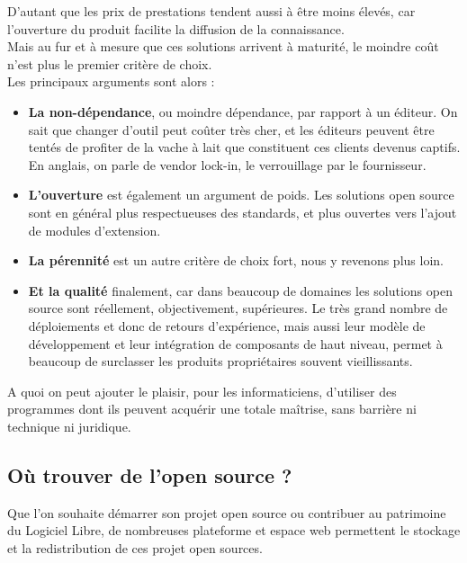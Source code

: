 			D'autant que les prix de prestations tendent aussi à être moins élevés, car l'ouverture du produit facilite la diffusion de la connaissance.\\

			Mais au fur et à mesure que ces solutions arrivent à maturité, le moindre coût n'est plus le premier critère de choix.\\
			Les principaux arguments sont alors :\\


			\begin{itemize}[label=\textbullet, font=\LARGE \color{burntorange}]
				\item \textbf{La non-dépendance}, ou moindre dépendance, par rapport à un éditeur. On sait que changer d'outil peut coûter très cher, et les éditeurs peuvent être tentés de profiter de la vache à lait que constituent ces clients devenus captifs. En anglais, on parle de vendor lock-in, le verrouillage par le fournisseur.
				\item \textbf{L'ouverture} est également un argument de poids. Les solutions open source sont en général plus respectueuses des standards, et plus ouvertes vers l'ajout de modules d'extension.
				\item \textbf{La pérennité} est un autre critère de choix fort, nous y revenons plus loin.
				\item \textbf{Et la qualité} finalement, car dans beaucoup de domaines les solutions open source sont réellement, objectivement, supérieures. Le très grand nombre de déploiements et donc de retours d'expérience, mais aussi leur modèle de développement et leur intégration de composants de haut niveau, permet à beaucoup de surclasser les produits propriétaires souvent vieillissants.
			\end{itemize}

			A quoi on peut ajouter le plaisir, pour les informaticiens, d'utiliser des programmes dont ils peuvent acquérir une totale maîtrise, sans barrière ni technique ni juridique.

		\subsection{Où trouver de l'open source ?} 

			Que l'on souhaite démarrer son projet open source ou contribuer au patrimoine du Logiciel Libre, de nombreuses plateforme et espace web permettent le stockage et la redistribution de ces projet open sources.

